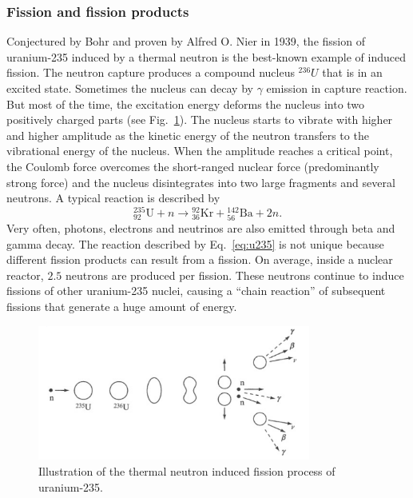 \documentclass[nofootinbib,preprint,aps]{revtex4-1}
\begin{document}
        \subsubsection{Fission and fission products}
        \label{sec:fission}
        Conjectured by Bohr and proven by Alfred O. Nier in 1939,
        the fission of uranium-235 induced by a thermal neutron
        is the best-known example of induced fission. 
        The neutron capture produces a compound nucleus ${}^{236}U$ that is in an excited state.
        Sometimes the nucleus can decay by $\gamma$ emission in capture reaction.
        But most of the time, the excitation energy deforms the nucleus into two positively charged
        parts (see Fig.~\ref{fig:fission}).
        The nucleus starts to vibrate with higher and higher amplitude as the kinetic energy of the
        neutron transfers to the vibrational energy of the nucleus.
        When the
        amplitude reaches a critical point, the Coulomb force overcomes the short-ranged nuclear
        force (predominantly strong force) and the nucleus disintegrates into two large fragments and several neutrons.
        A typical reaction is described by
        \begin{equation}
        {}^{235}_{92}\text{U} + n \rightarrow {}^{92}_{36}\text{Kr} + {}^{142}_{56}\text{Ba} + 2 n.
        \label{eq:u235}
        \end{equation}
        Very often, photons, electrons and neutrinos are also emitted through beta and gamma decay.
        The reaction described by Eq.~\ref{eq:u235} is not unique because different fission products can result
        from a fission.
        On average, inside a nuclear reactor, $2.5$ neutrons are produced per fission. These neutrons
        continue to induce fissions of other uranium-235 nuclei, causing a ``chain reaction'' of subsequent
        fissions that generate a huge amount of energy.\cite[chapt. 10]{l01}
        \begin{figure}[h]
            \centering
            \includegraphics[width=0.8\textwidth]{fission.png}
            \caption{Illustration of the thermal neutron induced fission process of uranium-235.\cite{l01}}
            \label{fig:fission}
        \end{figure}
\end{document}
